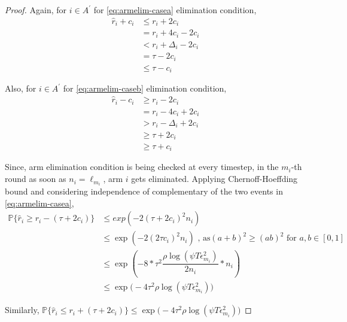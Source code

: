 \begin{proof}
Again, for ${i} \in A^{'}$ for \ref{eq:armelim-casea} elimination condition, 
\begin{align*}
\hat{r}_{i} + c_{i}&\leq r_{i} + 2c_{i} \\
&= r_{i} + 4c_{i} - 2c_{i} \\
&< r_{i} + \Delta_{i} - 2c_{i}\\
&= \tau -2c_{i} \\
&\leq \tau - c_{i}
\end{align*}

Also, for ${i} \in A^{'}$ for \ref{eq:armelim-caseb} elimination condition, 
\begin{align*}
\hat{r}_{i} - c_{i}&\geq r_{i} - 2c_{i} \\
&= r_{i} - 4c_{i} + 2c_{i} \\
&> r_{i} - \Delta_{i} + 2c_{i}\\
&\geq \tau + 2c_{i} \\
&\geq \tau + c_{i}
\end{align*}

Since, arm elimination condition is being checked at every timestep, in the $m_{i}$-th round as soon as $n_{i}=\ell_{m_{i}}$, arm $i$ gets eliminated. Applying Chernoff-Hoeffding bound and considering independence of complementary of the two events in \ref{eq:armelim-casea},
  \begin{align*}
\mathbb{P}\lbrace\hat{r}_{i}\geq r_{i} - (\tau + 2c_{i})\rbrace &\leq exp(-2(\tau + 2c_{i})^{2}n_{i})\\
&\leq \exp(-2(2\tau c_{i})^{2}n_{i}) \text{ , as} (a+b)^{2} \geq (ab)^{2} \text{ for } a,b\in[0,1]\\
&\leq \exp(-8 * \tau^{2}\dfrac{\rho\log (\psi T\epsilon_{m_{i}}^{2})}{2 n_{i}} *n_{i})\\
&\leq \exp\big(-4\tau^{2}\rho\log (\psi T\epsilon_{m_{i}}^{2})\big)
  \end{align*}
  

Similarly, $\mathbb{P}\lbrace\hat{r}_{i}\leq r_{i} + (\tau + 2c_{i})\rbrace\leq \exp\big(-4\tau^{2}\rho\log (\psi T\epsilon_{m_{i}}^{2})\big)$
 


\end{proof}
